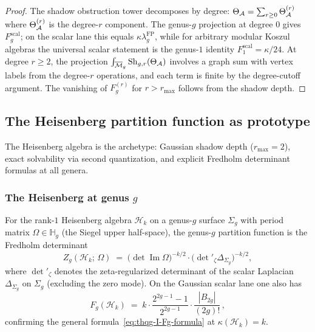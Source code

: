 \begin{proof}
The shadow obstruction tower decomposes by degree:
$\Theta_{\mathcal{A}} = \sum_{r \geq 0} \Theta_{\mathcal{A}}^{(r)}$ where
$\Theta_{\mathcal{A}}^{(r)}$ is the degree-$r$ component. The genus-$g$
projection at degree $0$ gives $F_g^{\mathrm{scal}}$; on the
scalar lane this equals
$\kappa\lambda_g^{\mathrm{FP}}$, while for arbitrary modular Koszul
algebras the universal scalar statement is the genus-$1$ identity
$F_1^{\mathrm{scal}}=\kappa/24$. At degree $r \geq 2$, the projection
$\int_{\overline{\mathcal{M}}_g} \operatorname{Sh}_{g,r}(\Theta_{\mathcal{A}})$
involves a graph sum with vertex labels from the degree-$r$ operations,
and each term is finite by the degree-cutoff argument. The vanishing of
$F_g^{(r)}$ for $r > r_{\max}$ follows from the shadow depth.
\end{proof}



\subsection{The Heisenberg partition function as prototype}
\label{subsec:thqg-I-heisenberg-prototype}

The Heisenberg algebra is the archetype: Gaussian shadow depth ($r_{\max} = 2$), exact solvability via second quantization, and explicit Fredholm determinant formulas at all genera.

\subsubsection{The Heisenberg at genus $g$}

\begin{theorem}
\label{thm:thqg-I-heisenberg-partition}
For the rank-$1$ Heisenberg algebra $\mathcal{H}_k$ on a genus-$g$ surface $\Sigma_g$ with period matrix $\Omega \in \mathbb{H}_g$ \textup{(}the Siegel upper half-space\textup{)}, the genus-$g$ partition function is the Fredholm determinant
\begin{equation}\label{eq:thqg-I-heisenberg-Zg}
\boxed{ Z_g(\mathcal{H}_k;\,\Omega) \;=\; \bigl(\det\operatorname{Im}\Omega\bigr)^{-k/2} \cdot \bigl(\det{}'_\zeta \Delta_{\Sigma_g}\bigr)^{-k/2}, }
\end{equation}
where $\det{}'_\zeta$ denotes the zeta-regularized determinant of the scalar Laplacian $\Delta_{\Sigma_g}$ on $\Sigma_g$ \textup{(}excluding the zero mode\textup{)}. On the Gaussian scalar lane one also has
\begin{equation}\label{eq:thqg-I-heisenberg-Fg}
F_g(\mathcal{H}_k) \;=\; k \cdot \frac{2^{2g-1}-1}{2^{2g-1}} \cdot \frac{|B_{2g}|}{(2g)!}\,,
\end{equation}
confirming the general formula~\eqref{eq:thqg-I-Fg-formula} at $\kappa(\mathcal{H}_k) = k$.
\end{theorem}

